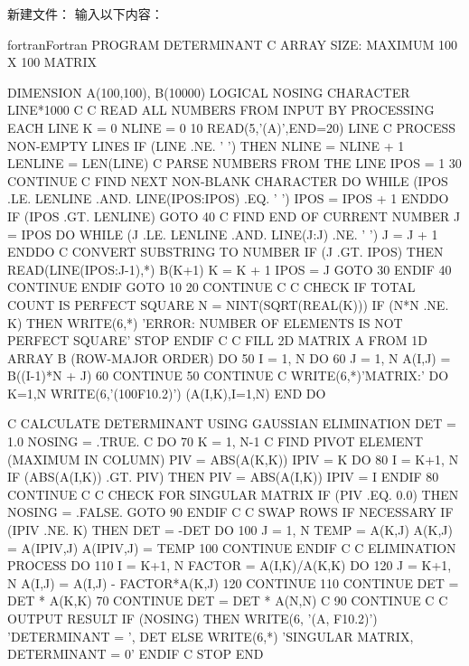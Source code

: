新建文件：
输入以下内容：
\begin{envcode}{fortran}{Fortran}
      PROGRAM DETERMINANT
C     ARRAY SIZE: MAXIMUM 100 X 100 MATRIX

      DIMENSION A(100,100), B(10000)
      LOGICAL NOSING
      CHARACTER LINE*1000
C
C     READ ALL NUMBERS FROM INPUT BY PROCESSING EACH LINE
      K = 0
      NLINE = 0
   10 READ(5,'(A)',END=20) LINE
C     PROCESS NON-EMPTY LINES
      IF (LINE .NE. ' ') THEN
        NLINE = NLINE + 1
        LENLINE = LEN(LINE)
C       PARSE NUMBERS FROM THE LINE
        IPOS = 1
   30   CONTINUE
C       FIND NEXT NON-BLANK CHARACTER
        DO WHILE (IPOS .LE. LENLINE .AND. LINE(IPOS:IPOS) .EQ. ' ')
          IPOS = IPOS + 1
        ENDDO
        IF (IPOS .GT. LENLINE) GOTO 40
C       FIND END OF CURRENT NUMBER
        J = IPOS
        DO WHILE (J .LE. LENLINE .AND. LINE(J:J) .NE. ' ')
          J = J + 1
        ENDDO
C       CONVERT SUBSTRING TO NUMBER
        IF (J .GT. IPOS) THEN
          READ(LINE(IPOS:J-1),*) B(K+1)
          K = K + 1
          IPOS = J
          GOTO 30
        ENDIF
   40   CONTINUE
      ENDIF
      GOTO 10
   20 CONTINUE
C
C     CHECK IF TOTAL COUNT IS PERFECT SQUARE
      N = NINT(SQRT(REAL(K)))
      IF (N*N .NE. K) THEN
        WRITE(6,*) 'ERROR: NUMBER OF ELEMENTS IS NOT PERFECT SQUARE'
        STOP
      ENDIF
C
C     FILL 2D MATRIX A FROM 1D ARRAY B (ROW-MAJOR ORDER)
      DO 50 I = 1, N
        DO 60 J = 1, N
          A(I,J) = B((I-1)*N + J)
   60   CONTINUE
   50 CONTINUE
C
      WRITE(6,*)'MATRIX:'
      DO K=1,N
      WRITE(6,'(100F10.2)') (A(I,K),I=1,N)
      END DO
      
C     CALCULATE DETERMINANT USING GAUSSIAN ELIMINATION
      DET = 1.0
      NOSING = .TRUE.
C
      DO 70 K = 1, N-1
C       FIND PIVOT ELEMENT (MAXIMUM IN COLUMN)
        PIV = ABS(A(K,K))
        IPIV = K
        DO 80 I = K+1, N
          IF (ABS(A(I,K)) .GT. PIV) THEN
            PIV = ABS(A(I,K))
            IPIV = I
          ENDIF
   80   CONTINUE
C
C       CHECK FOR SINGULAR MATRIX
        IF (PIV .EQ. 0.0) THEN
          NOSING = .FALSE.
          GOTO 90
        ENDIF
C
C       SWAP ROWS IF NECESSARY
        IF (IPIV .NE. K) THEN
          DET = -DET
          DO 100 J = 1, N
            TEMP = A(K,J)
            A(K,J) = A(IPIV,J)
            A(IPIV,J) = TEMP
  100     CONTINUE
        ENDIF
C
C       ELIMINATION PROCESS
        DO 110 I = K+1, N
          FACTOR = A(I,K)/A(K,K)
          DO 120 J = K+1, N
            A(I,J) = A(I,J) - FACTOR*A(K,J)
  120     CONTINUE
  110   CONTINUE
        DET = DET * A(K,K)
   70 CONTINUE
      DET = DET * A(N,N)
C
   90 CONTINUE
C
C     OUTPUT RESULT
      IF (NOSING) THEN
        WRITE(6, '(A, F10.2)') 'DETERMINANT = ', DET
      ELSE
        WRITE(6,*) 'SINGULAR MATRIX, DETERMINANT = 0'
      ENDIF
C
      STOP
      END
\end{envcode}

